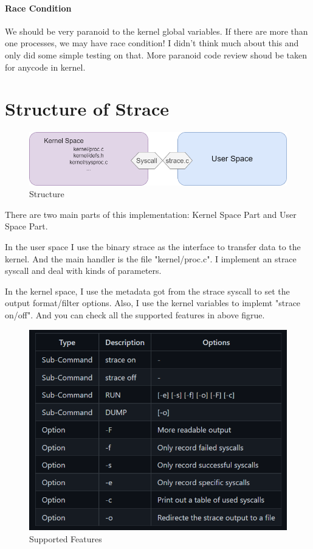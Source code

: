 \documentclass[11pt,oneside,a4paper]{article}
\begin{document}
\paragraph*{Race Condition}
We should be very paranoid to the kernel global variables. If there are more than one
processes, we may have race condition! I didn't think much about this and only did some
simple testing on that. More paranoid code review shoud be taken for anycode in kernel.


\section{Structure of Strace}

\begin{figure}[H]
    \includegraphics[width=4.75in]{1-36.png}
    \centering
    \caption{Structure}
\end{figure}
There are two main parts of this implementation: Kernel Space Part and User Space Part.

In the user space I use the binary strace as the interface to
transfer data to the kernel. And the main handler is the file "kernel/proc.c". I
implement an strace syscall and deal with kinds of parameters. 

In the kernel space, I use the metadata got from the strace syscall to set the
output format/filter options. Also, I use the kernel variables to implemt
"strace on/off". And you can check all the supported features in above figrue.


\begin{figure}[H]
    \includegraphics[width=4.75in]{1-39.png}
    \centering
    \caption{Supported Features}
\end{figure}
\end{document}
